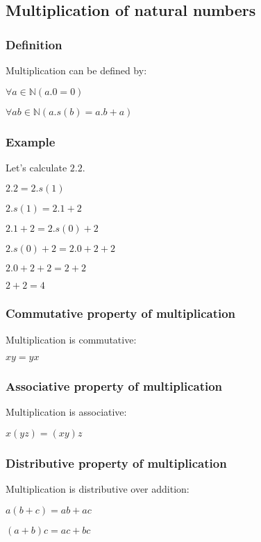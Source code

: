 \subsection{Multiplication of natural numbers}


\subsubsection{Definition}

Multiplication can be defined by:

\(\forall a \in \mathbb{N} (a.0=0)\)

\(\forall a b \in \mathbb{N} (a.s(b)=a.b+a)\)

\subsubsection{Example}

Let’s calculate \(2.2\).

\(2.2=2.s(1)\)

\(2.s(1)=2.1+2\)

\(2.1+2=2.s(0)+2\)

\(2.s(0)+2=2.0+2+2\)

\(2.0+2+2=2+2\)

\(2+2=4\)
\subsubsection{Commutative property of multiplication}

Multiplication is commutative:

\(xy=yx\)

\subsubsection{Associative property of multiplication}

Multiplication is associative:

\(x(yz)=(xy)z\)
\subsubsection{Distributive property of multiplication}

Multiplication is distributive over addition:

\(a(b+c)=ab+ac\)

\((a+b)c=ac+bc\)



